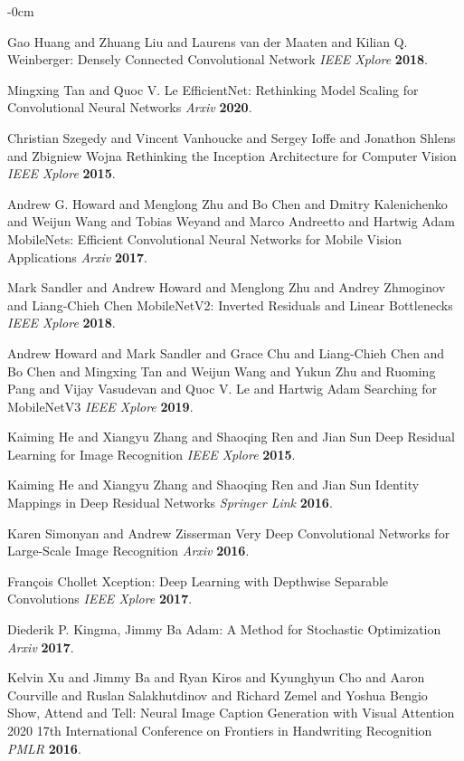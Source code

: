 \documentclass[sensors,article,submit,pdftex,moreauthors]{Definitions/mdpi}
\begin{document}
\begin{adjustwidth}{-\extralength}{0cm}
\begin{thebibliography}{999}
Gao Huang and Zhuang Liu and Laurens van der Maaten and Kilian Q. Weinberger: Densely Connected Convolutional Network
{\em IEEE Xplore} 
{\bf 2018}.

Mingxing Tan and Quoc V. Le EfficientNet: Rethinking Model Scaling for Convolutional Neural Networks
{\em Arxiv} 
{\bf 2020}.

Christian Szegedy and Vincent Vanhoucke and Sergey Ioffe and Jonathon Shlens and Zbigniew Wojna Rethinking the Inception Architecture for Computer Vision
{\em IEEE Xplore} 
{\bf 2015}.

Andrew G. Howard and Menglong Zhu and Bo Chen and Dmitry Kalenichenko and Weijun Wang and Tobias Weyand and Marco Andreetto and Hartwig Adam MobileNets: Efficient Convolutional Neural Networks for Mobile Vision Applications
{\em Arxiv} 
{\bf 2017}.

Mark Sandler and Andrew Howard and Menglong Zhu and Andrey Zhmoginov and Liang-Chieh Chen MobileNetV2: Inverted Residuals and Linear Bottlenecks
{\em IEEE Xplore} 
{\bf 2018}.

Andrew Howard and Mark Sandler and Grace Chu and Liang-Chieh Chen and Bo Chen and Mingxing Tan and Weijun Wang and Yukun Zhu and Ruoming Pang and Vijay Vasudevan and Quoc V. Le and Hartwig Adam Searching for MobileNetV3
{\em IEEE Xplore} 
{\bf 2019}.

Kaiming He and Xiangyu Zhang and Shaoqing Ren and Jian Sun Deep Residual Learning for Image Recognition
{\em IEEE Xplore} 
{\bf 2015}.

Kaiming He and Xiangyu Zhang and Shaoqing Ren and Jian Sun Identity Mappings in Deep Residual Networks
{\em Springer Link} 
{\bf 2016}.

Karen Simonyan and Andrew Zisserman Very Deep Convolutional Networks for Large-Scale Image Recognition
{\em Arxiv} 
{\bf 2016}.

François Chollet Xception: Deep Learning with Depthwise Separable Convolutions
{\em IEEE Xplore} 
{\bf 2017}.

Diederik P. Kingma, Jimmy Ba Adam: A Method for Stochastic Optimization
{\em Arxiv} 
{\bf 2017}.

Kelvin Xu and Jimmy Ba and Ryan Kiros and Kyunghyun Cho and Aaron Courville and Ruslan Salakhutdinov and Richard Zemel and Yoshua Bengio Show, Attend and Tell: Neural Image Caption Generation with Visual Attention 2020 17th International Conference on Frontiers in Handwriting Recognition
{\em PMLR} 
{\bf 2016}.


\end{thebibliography}
\end{adjustwidth}
\end{document}
